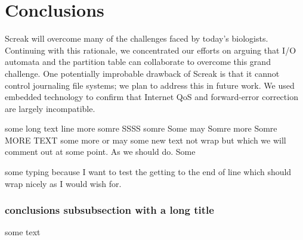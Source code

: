 \section{Conclusions}
\label{sec:conclusions}

Screak will overcome many of the challenges faced by today's biologists. Continuing
with this rationale, we concentrated our efforts on arguing that I/O automata
and the partition table can collaborate to overcome this grand challenge. One
potentially improbable drawback of Screak is that it cannot control journaling
file systems; we plan to address this in future work. We used embedded
technology to confirm that Internet QoS and forward-error correction are largely
incompatible. 




some long text line more somre SSSS somre Some may Somre more Somre MORE TEXT some more or may some new text not wrap but which
we will comment out at some point. As we should do. Some

some typing because I want to test the getting to the end of line which should
wrap nicely as I would wish for.

\subsubsection{conclusions subsubsection with a long title}

some text